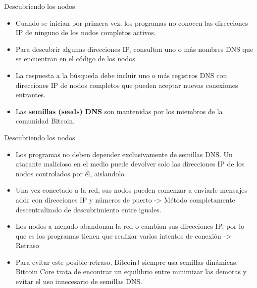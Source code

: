 \documentclass[compress,brown,xcolor=table]{beamer}
\begin{document}
\begin{frame}{Descubriendo los nodos}
\begin{itemize}
	\item Cuando se inician por primera vez, los programas no conocen las direcciones IP de ninguno de los nodos completos activos.\\

	\item Para descubrir algunas direcciones IP, consultan uno o más nombres DNS que se encuentran en el código de los nodos.\\

	\item La respuesta a la búsqueda debe incluir uno o más registros DNS con direcciones IP de nodos completos que pueden aceptar nuevas conexiones entrantes.\\

	\item Las \textbf{semillas (seeds) DNS} son mantenidas por los miembros de la comunidad Bitcoin.
\end{itemize}
\end{frame}

\begin{frame}{Descubriendo los nodos}
\begin{itemize}
	\item Los programas no deben depender exclusivamente de semillas DNS. Un atacante malicioso en el medio puede devolver solo las direcciones IP de los nodos controlados por él, aislandolo.\\

	\item Una vez conectado a la red, sus nodos pueden comenzar a enviarle mensajes addr con direcciones IP y números de puerto -> Método completamente descentralizado de descubrimiento entre iguales.\\

	\item Los nodos a menudo abandonan la red o cambian sus direcciones IP, por lo que es los programas tienen que realizar varios intentos de conexión -> Retraso \\

	\item Para evitar este posible retraso, BitcoinJ siempre usa semillas dinámicas. Bitcoin Core trata de encontrar un equilibrio entre minimizar las demoras y evitar el uso innecesario de semillas DNS.
\end{itemize}
\end{frame}
\end{document}

